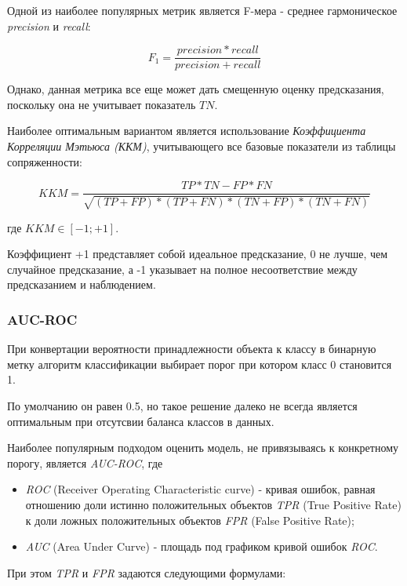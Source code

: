 \documentclass[utf8x, 14pt, oneside, a4paper]{article}
\begin{document}
	Одной из наиболее популярных метрик является F-мера - среднее гармоническое \textit{precision} и \textit{recall}:
	
	\begin{equation}
		F_1 = \frac{precision * recall}{precision + recall}
	\end{equation}

	Однако, данная метрика все еще может дать смещенную оценку предсказания, поскольку она не учитывает показатель $TN$.
	
	Наиболее оптимальным вариантом является использование \textit{Коэффициента Корреляции Мэтьюса (ККМ)}, учитывающего все базовые показатели из таблицы сопряженности:
	
	\begin{equation}
		KKM = \frac{TP * TN - FP * FN}{\sqrt{(TP+FP)*(TP+FN)*(TN+FP)*(TN+FN)}}
	\end{equation}

	где $KKM \in [-1;+1]$.
	
	Коэффициент +1 представляет собой идеальное предсказание, 0 не лучше, чем случайное предсказание, а -1 указывает на полное несоответствие между предсказанием и наблюдением.
	
	\subsubsection{AUC-ROC}
	
	При конвертации вероятности принадлежности объекта к классу в бинарную метку алгоритм классификации выбирает порог при котором класс 0 становится 1.
	
	По умолчанию он равен 0.5, но такое решение далеко не всегда является оптимальным при отсутсвии баланса классов в данных.
	
	Наиболее популярным подходом оценить модель, не привязываясь к конкретному порогу, является \textit{AUC-ROC}, где
	
	\begin{itemize}
		\item \textit{ROC} (Receiver Operating Characteristic curve) - кривая ошибок, равная отношению доли истинно положительных объектов \textit{TPR} (True Positive Rate) к доли ложных положительных объектов \textit{FPR} (False Positive Rate);
		\item \textit{AUC} (Area Under Curve) - площадь под графиком кривой ошибок \textit{ROC}.
	\end{itemize}

	При этом \textit{TPR} и \textit{FPR} задаются следующими формулами:
	
\end{document}
